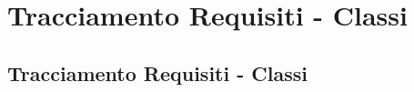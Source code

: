 \section{Tracciamento Requisiti - Classi}
\subsection{Tracciamento Requisiti - Classi}
\normalsize
%
%

\newpage